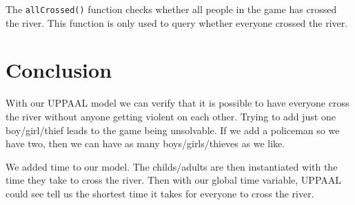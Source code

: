 \documentclass[a4paper,12pt]{article}
\begin{document}
The \lstinline|allCrossed()| function checks whether all people in the game has crossed the river. This function is only used to query whether everyone crossed the river.

\section*{Conclusion}

With our UPPAAL model we can verify that it is possible to have everyone cross the river without anyone getting violent on each other. Trying to add just one boy/girl/thief leads to the game being unsolvable. If we add a policeman so we have two, then we can have as many boys/girls/thieves as we like.

We added time to our model. The childs/adults are then instantiated with the time they take to cross the river. Then with our global time variable, UPPAAL could see tell us the shortest time it takes for everyone to cross the river.
\end{document}
